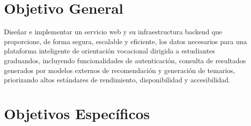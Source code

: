 \section{Objetivo General}
Diseñar e implementar un servicio web y su infraestructura backend que proporcione, de forma segura, escalable y eficiente, los datos necesarios para una plataforma inteligente de orientación vocacional dirigida a estudiantes graduandos, incluyendo funcionalidades de autenticación, consulta de resultados generados por modelos externos de recomendación y generación de temarios, priorizando altos estándares de rendimiento, disponibilidad y accesibilidad.

\section{Objetivos Específicos}
